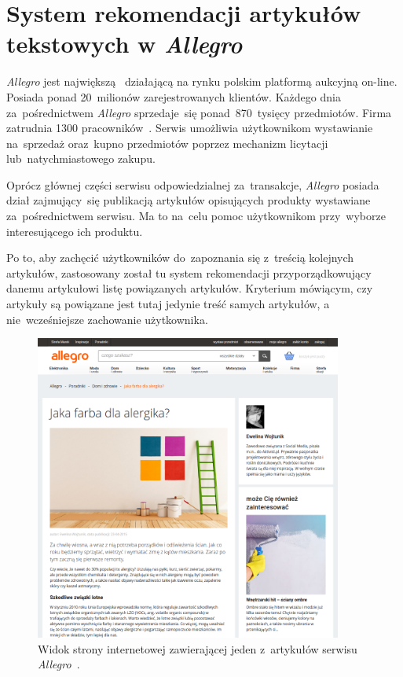 \documentclass[pl]{minipw} %
\begin{document}
\section{System rekomendacji artykułów tekstowych w \textit{Allegro}}%
\textit{Allegro} jest największą~\cite{all_naj} działającą na rynku polskim platformą aukcyjną on-line. Posiada ponad 20~milionów zarejestrowanych klientów. Każdego dnia za~pośrednictwem \textit{Allegro} sprzedaje~się ponad~870~tysięcy przedmiotów. Firma zatrudnia 1300 pracowników~\cite{allegro}. Serwis umożliwia użytkownikom wystawianie na~sprzedaż oraz~kupno przedmiotów poprzez mechanizm licytacji lub~natychmiastowego zakupu.

Oprócz głównej części serwisu odpowiedzialnej za~transakcje, \textit{Allegro} posiada dział zajmujący~się publikacją artykułów opisujących produkty wystawiane za~pośrednictwem serwisu. Ma to na~celu pomoc użytkownikom przy~wyborze interesującego ich produktu.

Po to, aby zachęcić użytkowników do~zapoznania się z~treścią kolejnych artykułów, zastosowany został tu system rekomendacji przyporządkowujący danemu artykułowi listę powiązanych artykułów. Kryterium mówiącym, czy artykuły są powiązane jest tutaj jedynie treść samych artykułów, a nie~wcześniejsze zachowanie użytkownika.

\begin{figure}[H]
	\centering
	\includegraphics[width=0.9\textwidth]{img/screen_allegro.png}
	\caption{Widok strony internetowej zawierającej jeden z~artykułów serwisu \textit{Allegro}~\cite{screen_allegro}.}
\end{figure}
\end{document}
